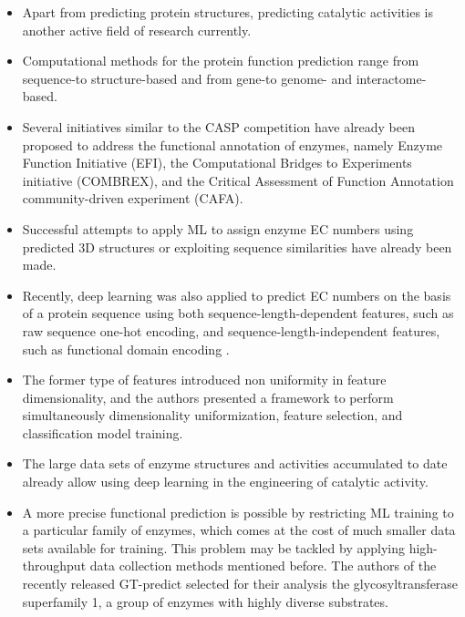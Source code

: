 \documentclass[12pt]{article}
\begin{document}
\begin{itemize}
\item Apart from predicting protein structures, predicting catalytic activities is another active field of research currently. 

\item Computational methods for the protein function prediction range from sequence-to structure-based and from gene-to genome- and interactome-based\cite{62}. 


\item Several initiatives similar to the CASP competition have already been proposed to address the functional annotation of enzymes, namely Enzyme Function Initiative (EFI), the Computational Bridges to Experiments initiative (COMBREX), and the Critical Assessment of Function Annotation community-driven experiment (CAFA). 


\item Successful attempts to apply ML to assign enzyme EC numbers using predicted 3D structures \cite{63} or exploiting sequence similarities \cite{64} have already been made. 

\item Recently, deep learning was also applied to predict EC numbers on the basis of a protein sequence using both sequence-length-dependent features, such as raw sequence one-hot encoding, and sequence-length-independent features, such as functional domain encoding \cite{65}.


\item The former type of features introduced non uniformity in feature dimensionality, and the authors presented a framework to perform simultaneously dimensionality uniformization,  feature selection, and  classification model training. 

\item The large data sets of enzyme structures and activities accumulated to date already allow using deep learning in the engineering of catalytic activity. 


\item A more precise functional prediction is possible by restricting ML training to a particular family of enzymes, which comes at the cost of much smaller data sets available for training. This problem may be tackled by applying high-throughput data collection methods mentioned before. The authors of the recently released GT-predict \cite{66} selected for their analysis the glycosyltransferase superfamily 1, a group of enzymes with highly diverse substrates. 



\end{itemize}
\end{document}
